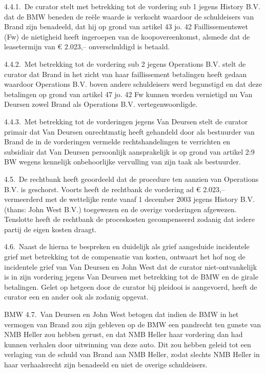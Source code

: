 \documentclass[
  dutch,
  a4paper,
]{article}
\begin{document}
4.4.1. De curator stelt met betrekking tot de vordering sub 1 jegens History B.V. dat de BMW beneden de reële waarde is verkocht waardoor de schuldeisers van Brand zijn benadeeld, dat hij op grond van artikel 43 jo. 42 Faillissementswet (Fw) de nietigheid heeft ingeroepen van de koopovereenkomst, alsmede dat de leasetermijn van € 2.023,-- onverschuldigd is betaald.

4.4.2. Met betrekking tot de vordering sub 2 jegens Operations B.V. stelt de curator dat Brand in het zicht van haar faillissement betalingen heeft gedaan waardoor Operations B.V. boven andere schuldeisers werd begunstigd en dat deze betalingen op grond van artikel 47 jo. 42 Fw kunnen worden vernietigd nu Van Deursen zowel Brand als Operations B.V. vertegenwoordigde.

4.4.3. Met betrekking tot de vorderingen jegens Van Deursen stelt de curator primair dat Van Deursen onrechtmatig heeft gehandeld door als bestuurder van Brand de in de vorderingen vermelde rechtshandelingen te verrichten en subsidiair dat Van Deursen persoonlijk aansprakelijk is op grond van artikel 2:9 BW wegens kennelijk onbehoorlijke vervulling van zijn taak als bestuurder.

4.5. De rechtbank heeft geoordeeld dat de procedure ten aanzien van Operations B.V. is geschorst. Voorts heeft de rechtbank de vordering ad € 2.023,-- vermeerderd met de wettelijke rente vanaf 1 december 2003 jegens History B.V. (thans: John West B.V.) toegewezen en de overige vorderingen afgewezen. Tenslotte heeft de rechtbank de proceskosten gecompenseerd zodanig dat iedere partij de eigen kosten draagt.

4.6. Naast de hierna te bespreken en duidelijk als grief aangeduide incidentele grief met betrekking tot de compensatie van kosten, ontwaart het hof nog de incidentele grief van Van Deursen en John West dat de curator niet-ontvankelijk is in zijn vordering jegens Van Deursen met betrekking tot de BMW en de girale betalingen. Gelet op hetgeen door de curator bij pleidooi is aangevoerd, heeft de curator een en ander ook als zodanig opgevat.

BMW
4.7. Van Deursen en John West betogen dat indien de BMW in het vermogen van Brand zou zijn gebleven op de BMW een pandrecht ten gunste van NMB Heller zou hebben gerust, en dat NMB Heller haar vordering dan had kunnen verhalen door uitwinning van deze auto. Dit zou hebben geleid tot een verlaging van de schuld van Brand aan NMB Heller, zodat slechts NMB Heller in haar verhaalsrecht zijn benadeeld en niet de overige schuldeisers.
\end{document}
